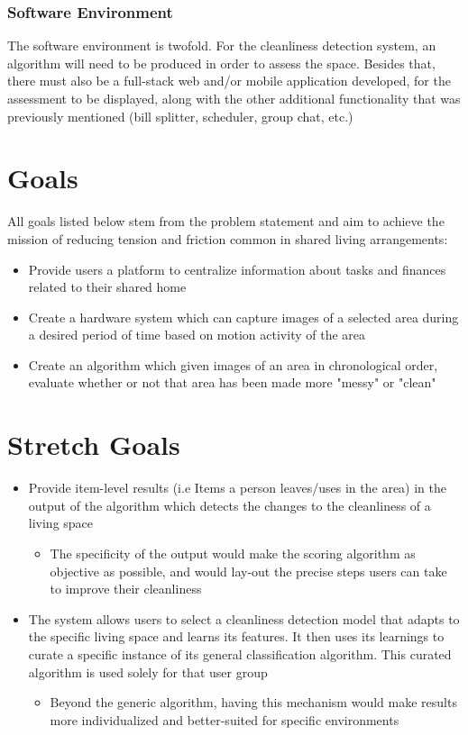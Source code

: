 \documentclass{article}
\begin{document}
\subsubsection{Software Environment}
The software environment is twofold. For the cleanliness detection system, an algorithm
will need to be produced in order to assess the space. Besides that, there must also be a
full-stack web and/or mobile application developed, for the assessment to be displayed, along
with the other additional functionality that was previously mentioned (bill splitter, scheduler,
group chat, etc.)
\section{Goals}
All goals listed below stem from the problem statement and aim to achieve the mission of reducing tension and friction common in shared living arrangements:
\begin{itemize}
\item Provide users a platform to centralize information about tasks and finances related to their shared home
\item Create a hardware system which can capture images of a selected area during a desired period of time based on motion activity of the area
\item Create an algorithm which given images of an area in chronological order, evaluate whether or not that area has been made more "messy" or "clean"
\end{itemize}
\section{Stretch Goals}
\begin{itemize}
\item Provide item-level results (i.e Items a person leaves/uses in the area) in the output of the algorithm which detects the changes to the cleanliness of a living space
\begin{itemize}
\item The specificity of the output would make the scoring algorithm as objective as possible, and would lay-out the precise steps users can take to improve their cleanliness
\end{itemize}
\item The system allows users to select a cleanliness detection model that adapts to the specific living space and learns its features. It then uses its learnings to curate a specific instance of its general classification algorithm. This curated algorithm is used solely for that user group
\begin{itemize}
\item Beyond the generic algorithm, having this mechanism would make results more individualized and better-suited for specific environments
\end{itemize}
\end{itemize}
\end{document}
